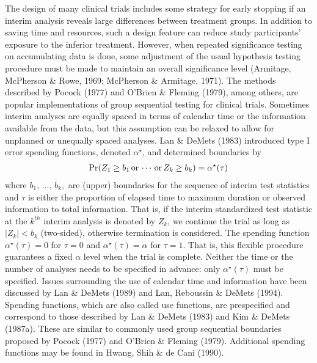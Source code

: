 The design of many clinical trials includes some strategy for early
stopping if an interim analysis reveals large differences between treatment
groups.  In addition to saving time and resources, such a design feature
can reduce study participants' exposure to the inferior treatment.
However, when repeated significance testing on accumulating data is done,
some adjustment of the usual hypothesis testing procedure must be made to
maintain an overall significance level (Armitage, McPherson \& Rowe, 1969;
McPherson \& Armitage, 1971).  The methods described by Pocock (1977) and
O'Brien \& Fleming (1979), among others, are popular implementations of
group sequential testing for clinical trials.  Sometimes interim analyses
are equally spaced in terms of calendar time or the information available
from the data, but this assumption can be relaxed to allow for unplanned or
unequally spaced analyses.  Lan \& DeMets (1983) introduced type I error
spending functions, denoted $\alpha^{\star}$, and determined boundaries by
\begin{eqnarray}
  {\rm Pr}
  (Z_1 \geq b_1 \, {\rm or} \,
         \cdots     \, {\rm or} \,
   Z_k \geq b_k)
  =
  \alpha^{\star}(\tau)
  \label{eqn:ldm}
\end{eqnarray}
where
\begin{math}
  b_1,\,\ldots,\,b_k,
\end{math}
are (upper) boundaries for the sequence of interim test statistics and
$\tau$ is either the proportion of elapsed time to maximum duration or
observed information to total information.  That is, if the interim
standardized test statistic at the $k^{th}$ interim analysis is denoted by
$Z_k$, we continue the trial as long as $| Z_k | < b_k$ (two-sided),
otherwise termination is considered.  The spending function
$\alpha^{\star}(\tau)=0$ for $\tau=0$ and $\alpha^{\star}(\tau) = \alpha$
for $\tau = 1$.  That is, this flexible procedure guarantees a fixed
$\alpha$ level when the trial is complete.  Neither the time or the number
of analyses needs to be specified in advance: only $\alpha^{\star}(\tau)$
must be specified.  Issues surrounding the use of calendar time and
information have been discussed by Lan \& DeMets (1989) and Lan, Reboussin
\& DeMets (1994).  Spending functions, which are also called use functions,
are prespecified and correspond to those described by Lan \& DeMets (1983)
and Kim \& DeMets (1987a).  These are similar to commonly used group
sequential boundaries proposed by Pocock (1977) and O'Brien \& Fleming
(1979).  Additional spending functions may be found in Hwang, Shih \& de
Cani (1990).

